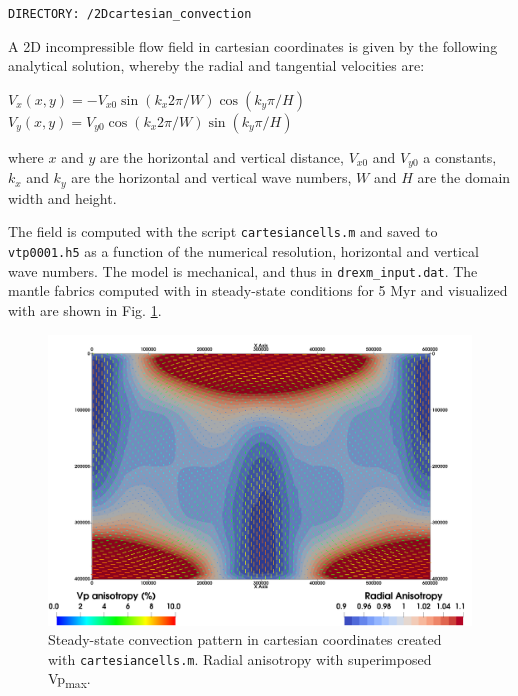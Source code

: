 \texttt{DIRECTORY: /2Dcartesian\_convection}

A 2D incompressible flow field in cartesian coordinates is given by the following analytical solution, whereby the radial and tangential velocities are: \\
\begin{center}
    $V_x(x,y) = -V_{x0}\sin(k_x2\pi/W)\cos(k_y\pi/H)$ \\
    $V_y(x,y) =  V_{y0}\cos(k_x2\pi/W)\sin(k_y\pi/H)$ \\
\end{center}

where $x$ and $y$ are the horizontal and vertical distance, $V_{x0}$ and $V_{y0}$ a constants, $k_x$ and $k_y$ are the horizontal and vertical wave numbers, $W$ and $H$ are the domain width and height. 

The  field is computed with the \matlabtitle{} script \texttt{cartesiancells.m} and saved to \texttt{vtp0001.h5} as a function of the numerical resolution, horizontal and vertical wave numbers. The model is mechanical, and thus   in \texttt{drexm\_input.dat}.
The mantle fabrics computed with \drexmtitle{} in steady-state conditions for 5 Myr and visualized with \viztomotitle{} are shown in Fig. \ref{fig:cartesiancells}.


\begin{figure}[ht]
    \centering
    \includegraphics[width=1.0\textwidth]{cookbooks/2Dcartesian_convection_white.png}
    \caption{Steady-state convection pattern in cartesian coordinates created with \texttt{cartesiancells.m}. Radial anisotropy with superimposed Vp\textsubscript{max}.\\
    }
    \label{fig:cartesiancells}
\end{figure}

